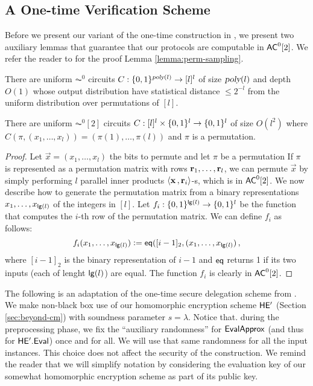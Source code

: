 \subsection{A One-time Verification Scheme}

Before we present our variant of the one-time construction in \cite{ckv10}, we present two auxiliary lemmas that guarantee that our protocols are computable in ${\mathsf{AC}}^0[2]$. We refer the reader to \cite{hag91,matias91} for the proof Lemma \ref{lemma:perm-sampling}. %

\begin{lemma}{\cite{hag91,matias91}}
\label{lemma:perm-sampling}
There are uniform $\AC^0$ circuits $C: \{0, 1\}^{{\textsl{poly}}(l)}\to [l]^l$ of size ${\textsl{poly}}(l)$ and depth $O(1)$ whose output distribution have statistical distance $\leq 2^{-l}$ from the uniform distribution over permutations of $[l]$.
\end{lemma}

\begin{lemma}
\label{lemma:perm-evaluation}
There are uniform $\AC^0[2]$ circuits $C: [l]^l \times \{0, 1\}^l \to \{0, 1\}^l$ of size $O(l^2)$ where $C(\pi, (x_1,\dots, x_l)) = (\pi(1),\dots,\pi(l))$ and $\pi$ is a permutation.
\end{lemma}
\begin{proof}
Let $\vec{x} = (x_1,\dots,x_l)$ the bits to permute and let $\pi$ be a permutation
If $\pi$ is represented as a permutation matrix with rows $\mathbf{r}_1,\dots,\mathbf{r}_l$, we can permute $\vec{x}$ by simply performing $l$ parallel inner products $\langle \mathbf{x} \, , \mathbf{r}_i \rangle$-s, which is in ${\mathsf{AC}}^0[2]$.
We now describe how to generate the permutation matrix from a binary representations $x_1,\dots,x_{\mathsf{lg}(l)}$ of the integers in $[l]$.
Let $f_i : \{0, 1\}^{\mathsf{lg}(l)} \to \{0, 1\}^l$ be the function that computes the $i$-th row of the permutation matrix. We can define $f_i$ as follows:
\[
    f_i(x_1,\dots,x_{\mathsf{lg}(l)}) \vcentcolon= \mathsf{eq}([i-1]_2, (x_1,\dots,x_{\mathsf{lg}(l)}) \, ,
\]
where $[i-1]_2$ is the binary representation of $i-1$ and $\mathsf{eq}$ returns 1 if its two inputs (each of lenght $\mathsf{lg}(l)$) are equal.
The function $f_i$ is clearly in ${\mathsf{AC}}^0[2]$.

\end{proof}

The following is an adaptation of the one-time secure delegation scheme from \cite{ckv10}. We make non-black box use of our homomorphic encryption scheme $\mathsf{HE'}$ (Section \ref{sec:beyond-cm}) with soundness parameter $s= \lambda$. Notice that. during the preprocessing phase, we fix the ``auxiliary randomness'' for $\mathsf{EvalApprox}$ (and thus for $\mathsf{HE'.Eval}$) once and for all. We will use that same randomness for all the input instances. This choice does not affect the security of the construction.
We remind the reader that we will simplify notation by considering the evaluation key of our somewhat homomorphic encryption scheme as part of its public key.

